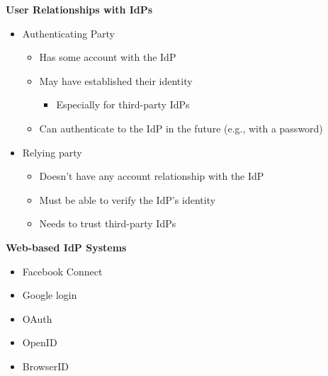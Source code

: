 \documentclass[helvetica]{seminar}
\newcommand{\heading}[1]{%
  \begin{center} 
    \large\bf 
    #1 
  \end{center} 
  \vspace{.4 in}}
\begin{document}
\begin{slide}
\heading{User Relationships with IdPs}

\begin{itemize}
\item Authenticating Party
  \begin{itemize}
  \item Has some account with the IdP
  \item May have established their identity 
    \begin{itemize}
    \item Especially for third-party IdPs
    \end{itemize}
  \item Can authenticate to the IdP in the future (e.g., with a password)
  \end{itemize}

\item Relying party
  \begin{itemize}
  \item Doesn't have any account relationship with the IdP
  \item Must be able to verify the IdP's identity
  \item Needs to trust third-party IdPs
  \end{itemize}

\end{itemize}
\end{slide}


\begin{slide}
\heading{Web-based IdP Systems}

\begin{itemize}
\item Facebook Connect
\item Google login
\item OAuth
\item OpenID
\item BrowserID
\end{itemize}

\end{slide}
\end{document}
